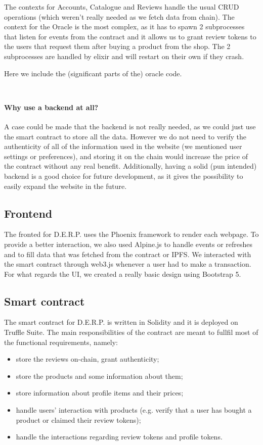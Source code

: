 \documentclass[12pt,a4paper,oneside]{article}
\theoremstyle{definition}
\begin{document}
The contexts for Accounts, Catalogue and Reviews handle the usual CRUD operations (which weren't really needed as we fetch data from chain).
The context for the Oracle is the most complex, as it has to spawn 2 subprocesses that listen for events from the contract and it allows us to grant review tokens to the users that request them after buying a product from the shop. The 2 subprocesses are handled by elixir and will restart on their own if they crash. 

Here we include the (significant parts of the) oracle code.

\inputminted{Elixir}{event_handler.ex}
\inputminted{Elixir}{oracle.ex}

\paragraph{Why use a backend at all?} A case could be made that the backend is not really needed, as we could just use the smart contract to store all the data. However we do not need to verify the authenticity of all of the information used in the website (we mentioned user settings or preferences), and storing it on the chain would increase the price of the contract without any real benefit. Additionally, having a solid (pun intended) backend is a good choice for future development, as it gives the possibility to easily expand the website in the future. \\ 

\subsection{Frontend}

 The fronted for D.E.R.P. uses the Phoenix framework to render each webpage. To provide a better interaction, we also used Alpine.js  to handle events or refreshes and to fill data that was fetched from the contract or IPFS. We interacted with the smart contract through web3.js whenever a user had to make a transaction. For what regards the UI, we created a really basic design using Bootstrap 5.  \\

\subsection{Smart contract}

The smart contract for D.E.R.P. is written in Solidity and it is deployed on Truffle Suite. The main responsibilities of the contract are meant to fullfil most of the functional requirements, namely:
\begin{itemize} 
	\item store the reviews on-chain, grant authenticity;
	\item store the products and some information about them;
	\item store information about profile items and their prices;
	\item handle users' interaction with products (e.g. verify that a user has bought a product or claimed their review tokens);
	\item handle the interactions regarding review tokens and profile tokens.
\end{itemize}
\end{document}
